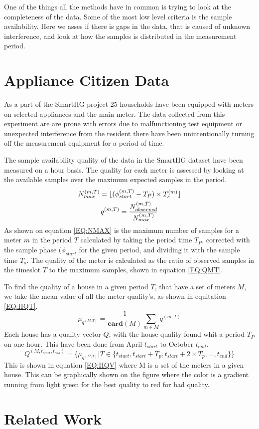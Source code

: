 One of the things all the methods have in common is trying to look at the completeness of the data. Some of the most low level criteria is the sample availability. Here we asses if there is gaps in the data, that is caused of unknown interference, and look at how the samples is distributed in the measurement period.  


\section{Appliance Citizen Data}
As a part of the SmartHG project 25 households have been equipped with meters on selected appliances and the main meter. The data collected from this experiment are are prone with errors due to malfunctioning test equipment or unexpected interference from the resident there have been unintentionally turning off the measurement equipment for a period of time. 

The sample availability quality of the data in the SmartHG dataset have been measured on a hour basis.  The quality for each meter is assessed by looking at the available samples over the maximum expected samples in the period.  
\begin{gather}
		N_{max}^{(m,T)} = \lfloor (\phi_{start}^{(m,T)} - T_{P})\times T_s^{(m)} \rfloor \label{EQ:NMAX} \\
		q^{(m,T)} = \frac{N_{observed}^{(m,T)}}{ N_{max}^{(m,T)} } \label{EQ:QMT}
\end{gather}
As shown on equation \ref{EQ:NMAX} is the maximum number of samples for a meter $m$ in the period $T$ calculated by taking the period time $T_P$, corrected with the sample phase $(\phi_{start}$ for the given period, and dividing it with the sample time $T_s$. The quality of the meter is calculated as the ratio of observed samples in the timeslot $T$ to the maximum samples, shown in equation \ref{EQ:QMT}. 

To find the quality of a house in a given period $T$, that have a set of meters $M$, we take the mean value of all the meter quality's, as shown in equitation \ref{EQ:HQT}.  
\begin{equation}
	\mu_{q^{(M,T)}} = \frac{1}{\mathbf{card}(M)} \sum_{m \in M} q^{(m,T)}
	\label{EQ:HQT}
\end{equation}
Each house has a quality vector $Q$, with the house quality found whit a period $T_P$ on one hour. This have been done from April $t_{start}$ to October $t_{end}$. 
\begin{equation}
	Q^{(M,t_{start},t_{end} )} = \{ \mu_{q^{(M,T)}} | T \in \{t_{start}, t_{start}+T_p,t_{start}+2 \times T_p, ... , t_{end}  \} \}
	\label{EQ:HQV}
\end{equation}
This is shown in equation \ref{EQ:HQV} where M is a set of the meters in a given house. This can be graphically shown on the figure  where the color is a gradient running from light green for the best quality to red for bad quality.   


\section{Related Work}